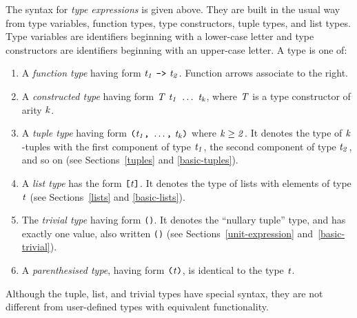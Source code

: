 \noindent
The syntax for \Haskell{}
{\em type expressions} is given above. 
They are built in the usual way
from type variables, function types, type constructors, tuple types,
and list types.  Type variables are identifiers beginning with a lower-case
letter and type constructors are identifiers beginning with an upper-case
letter.  A type is one of:\nopagebreak[4]
\begin{enumerate}
\item A {\em function type} having form 
\mbox{$\it t_1\ \makebox{\tt ->}\ t_2$}.  Function arrows associate to the right.

\item A {\em constructed type} having form 
\mbox{$\it T\ t_1\ \ldots \ t_k$}, where \mbox{$\it T$} is a type constructor of arity \mbox{$\it k$}.

\item A {\em tuple type} having form 
\mbox{$\it \makebox{\tt (}t_1\makebox{\tt ,}\ \ldots \makebox{\tt ,}\ t_k\makebox{\tt )}$} where \mbox{$\it k\geq 2$}.  It denotes the type of
\mbox{$\it k$}-tuples with the first component of type \mbox{$\it t_1$}, the second
component of type \mbox{$\it t_2$}, and so on (see Sections~\ref{tuples}
and \ref{basic-tuples}).

\item A {\em list type} has the form \mbox{$\it \makebox{\tt [}t\makebox{\tt ]}$}.  
It denotes the type of lists with elements of type \mbox{$\it t$} (see
Sections~\ref{lists} and \ref{basic-lists}).

\item The {\em trivial type} having form \mbox{\tt ()}.
It denotes the ``nullary tuple'' type, and has exactly one value,
also written \mbox{\tt ()} (see Sections~\ref{unit-expression}
and~\ref{basic-trivial}).

\item A {\em parenthesised type}, having form \mbox{$\it \makebox{\tt (}t\makebox{\tt )}$}, is identical to
the type \mbox{$\it t$}.
\end{enumerate}

Although the tuple, list, and trivial types have special syntax, they
are not different from user-defined types with equivalent
functionality.

